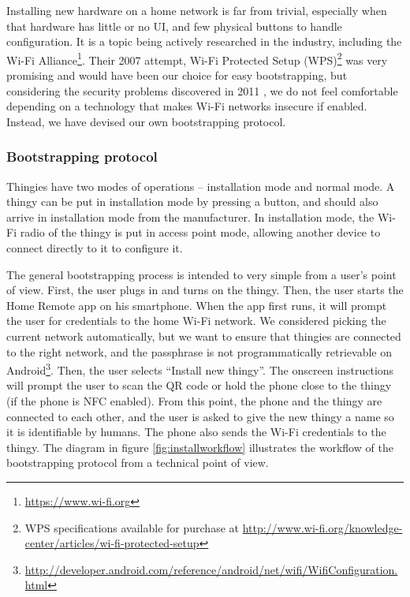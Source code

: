 \documentclass{ubicomp2012}
\begin{document}
Installing new hardware on a home network is far from trivial, especially when that hardware has little or no UI, and few physical buttons to handle configuration. It is a topic being actively researched in the industry, including the Wi-Fi Alliance\footnote{\url{https://www.wi-fi.org}}. Their 2007 attempt, Wi-Fi Protected Setup (WPS)\footnote{WPS specifications available for purchase at \url{http://www.wi-fi.org/knowledge-center/articles/wi-fi-protected-setup}\texttrademark} was very promising and would have been our choice for easy bootstrapping, but considering the security problems discovered in 2011 \cite{StefanWPS}, we do not feel comfortable depending on a technology that makes Wi-Fi networks insecure if enabled. Instead, we have devised our own bootstrapping protocol.

\subsubsection{Bootstrapping protocol}

Thingies have two modes of operations -- installation mode and normal mode. A thingy can be put in installation mode by pressing a button, and should also arrive in installation mode from the manufacturer. In installation mode, the Wi-Fi radio of the thingy is put in access point mode, allowing another device to connect directly to it to configure it.

The general bootstrapping process is intended to very simple from a user's point of view. First, the user plugs in and turns on the thingy. Then, the user starts the Home Remote app on his smartphone. When the app first runs, it will prompt the user for credentials to the home Wi-Fi network. We considered picking the current network automatically, but we want to ensure that thingies are connected to the right network, and the passphrase is not programmatically retrievable on Android\footnote{\url{http://developer.android.com/reference/android/net/wifi/WifiConfiguration.html}}. Then, the user selects ``Install new thingy''. The onscreen instructions will prompt the user to scan the QR code or hold the phone close to the thingy (if the phone is NFC enabled). From this point, the phone and the thingy are connected to each other, and the user is asked to give the new thingy a name so it is identifiable by humans. The phone also sends the Wi-Fi credentials to the thingy. The diagram in figure \ref{fig:installworkflow} illustrates the workflow of the bootstrapping protocol from a technical point of view.
\end{document}
